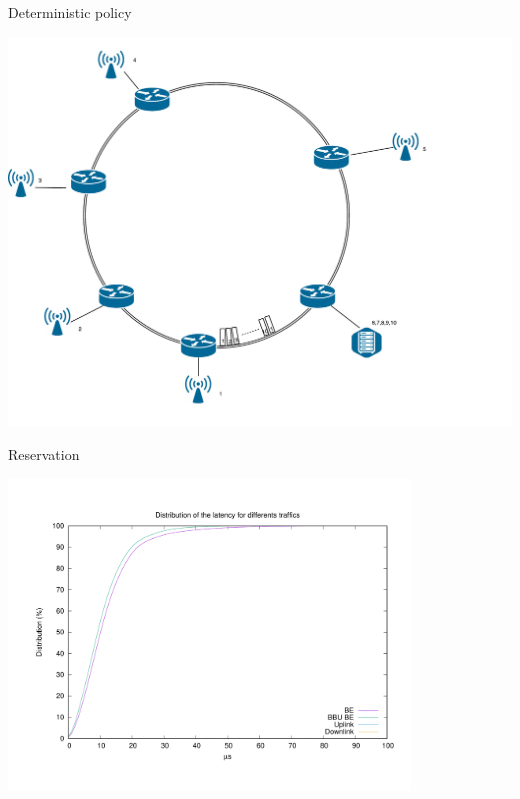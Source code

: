 \documentclass[10 pt]{beamer}
\begin{document}
\begin{frame}{Deterministic policy}

\hspace{2cm}
\includegraphics[scale=0.35]{slotsanneau.pdf}



\end{frame}







\begin{frame}{Reservation}



\centering \includegraphics[width=0.8\textwidth]{Reservation.pdf} 



\end{frame}
\end{document}
